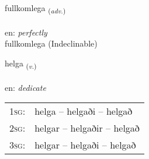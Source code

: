 \documentclass[frontgrid, backgrid]{flacards}\usepackage[]{graphicx}\usepackage[]{xcolor}
\begin{document}

\renewcommand{\flhead}{\vskip5pt \fboxsep=0pt {\small\bfseries\footnotesize Atviksorð | Adverb}}
\renewcommand{\fcfoot}{\vskip5pt \fboxsep=0pt \hspace{2pt}{\small\bfseries\footnotesize 3K}}

\renewcommand{\blhead}{\vskip5pt {\small\bfseries\footnotesize Atviksorð | Adverb }}
\renewcommand{\bcfoot}{\vskip5pt \hspace{2pt}{\small\bfseries\footnotesize 3K}}


{fullkomlega \small{\textsubscript{(\textit{adv.})}} \\[1ex]
 \\
en: \emph{perfectly} \\  [2ex]
fullkomlega (Indeclinable)}

\renewcommand{\flhead}{\vskip5pt \fboxsep=0pt {\small\bfseries\footnotesize Sagnorð | Verb}}
\renewcommand{\fcfoot}{\vskip5pt \fboxsep=0pt \hspace{2pt}{\small\bfseries\footnotesize 3K}}

\renewcommand{\blhead}{\vskip5pt {\small\bfseries\footnotesize Sagnorð | Verb }}
\renewcommand{\bcfoot}{\vskip5pt \hspace{2pt}{\small\bfseries\footnotesize 3K}}


{helga \small{\textsubscript{(\textit{v.})}} \\[1ex] %
\textphonetic{[hɛlka]} \\
en: \emph{dedicate} \\  [2ex]
\renewcommand*{\arraystretch}{0.8}
\begin{tabular}{p{1cm}l}
\textsc{1sg}: & helga -- helgaði -- helgað \\ 
\textsc{2sg}: & helgar -- helgaðir -- helgað \\ 
\textsc{3sg}: & helgar -- helgaði -- helgað \\ 
\end{tabular}
}
\end{document}
